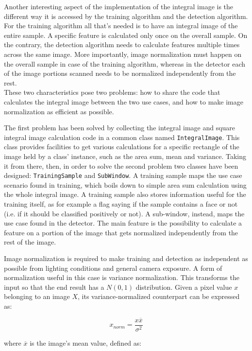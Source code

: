 \documentclass[a4paper,12pt,titlepage]{article}
\begin{document}
Another interesting aspect of the implementation of the integral image is the
different way it is accessed by the training algorithm and the detection
algorithm. For the training algorithm all that's needed is to have an integral
image of the entire sample. A specific feature is calculated only once on the
overall sample. On the contrary, the detection algorithm needs to calculate
features multiple times across the same image. More importantly, image
normalization must happen on the overall sample in case of the training
algorithm, whereas in the detector each of the image portions scanned needs to
be normalized independently from the rest. \\
These two characteristics pose two problems: how to share the code that
calculates the integral image between the two use cases, and how to make image
normalization as efficient as possible.

The first problem has been solved by collecting the integral image and square
integral image calculation code in a common class named \texttt{IntegralImage}.
This class provides facilities to get various calculations for a specific
rectangle of the image held by a class' instance, such as the area sum, mean and
variance.  Taking it from there, then, in order to solve the second problem two
classes have been designed: \texttt{TrainingSample} and \texttt{SubWindow}. A
training sample maps the use case scenario found in training, which boils down
to simple area sum calculation using the whole integral image. A training sample
also stores information useful for the training itself, as for example a flag
saying if the sample contains a face or not (i.e. if it should be classified
positively or not). A sub-window, instead, maps the use case found in the
detector. The main feature is the possibility to calculate a feature on a
portion of the image that gets normalized independently from the rest of the
image.

Image normalization is required to make training and detection as independent as
possible from lighting conditions and general camera exposure. A form of
normalization useful in this case is variance normalization. This transforms the
input so that the end result has a $N(0,1)$ distribution.
Given a pixel value $x$ belonging to an image $X$, its variance-normalized
counterpart can be expressed as:

\[ x_{norm} = \dfrac{x \overline{x}}{\sigma^{2}} \]

where $\overline{x}$ is the image's mean value, defined as:
\end{document}
